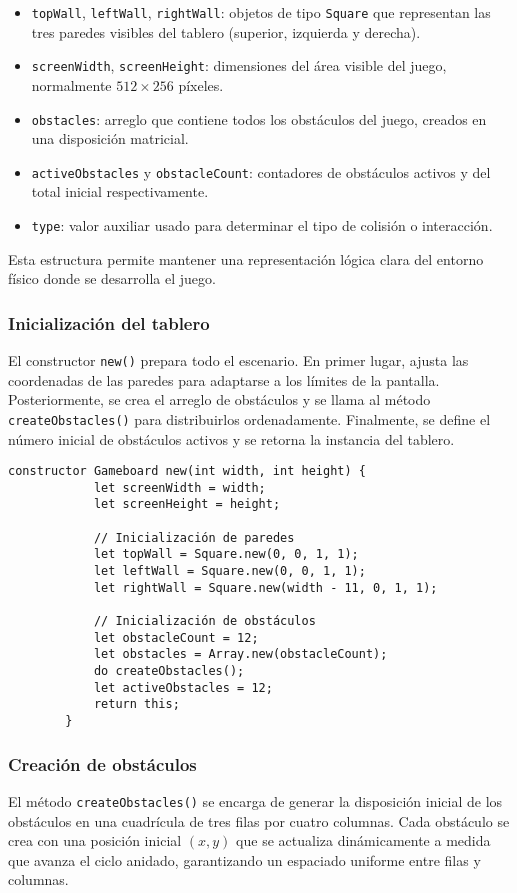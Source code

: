 \documentclass[twocolumn]{article}
\begin{document}
	\begin{itemize}
		\item \texttt{topWall}, \texttt{leftWall}, \texttt{rightWall}: objetos de tipo \texttt{Square} que representan las tres paredes visibles del tablero (superior, izquierda y derecha).
		\item \texttt{screenWidth}, \texttt{screenHeight}: dimensiones del área visible del juego, normalmente $512 \times 256$ píxeles.
		\item \texttt{obstacles}: arreglo que contiene todos los obstáculos del juego, creados en una disposición matricial.
		\item \texttt{activeObstacles} y \texttt{obstacleCount}: contadores de obstáculos activos y del total inicial respectivamente.
		\item \texttt{type}: valor auxiliar usado para determinar el tipo de colisión o interacción.
	\end{itemize}
	
	Esta estructura permite mantener una representación lógica clara del entorno físico donde se desarrolla el juego.
	
	\subsubsection{Inicialización del tablero}
	El constructor \texttt{new()} prepara todo el escenario. En primer lugar, ajusta las coordenadas de las paredes para adaptarse a los límites de la pantalla. Posteriormente, se crea el arreglo de obstáculos y se llama al método \texttt{createObstacles()} para distribuirlos ordenadamente.  
	Finalmente, se define el número inicial de obstáculos activos y se retorna la instancia del tablero.
	
	\begin{lstlisting}[caption=Constructor del tablero de juego]
		constructor Gameboard new(int width, int height) {
			let screenWidth = width;
			let screenHeight = height;
			
			// Inicialización de paredes
			let topWall = Square.new(0, 0, 1, 1);
			let leftWall = Square.new(0, 0, 1, 1);
			let rightWall = Square.new(width - 11, 0, 1, 1);
			
			// Inicialización de obstáculos
			let obstacleCount = 12;
			let obstacles = Array.new(obstacleCount);
			do createObstacles();
			let activeObstacles = 12; 
			return this;
		}
	\end{lstlisting}
	
	\subsubsection{Creación de obstáculos}
	El método \texttt{createObstacles()} se encarga de generar la disposición inicial de los obstáculos en una cuadrícula de tres filas por cuatro columnas. Cada obstáculo se crea con una posición inicial $(x, y)$ que se actualiza dinámicamente a medida que avanza el ciclo anidado, garantizando un espaciado uniforme entre filas y columnas.
	
\end{document}
